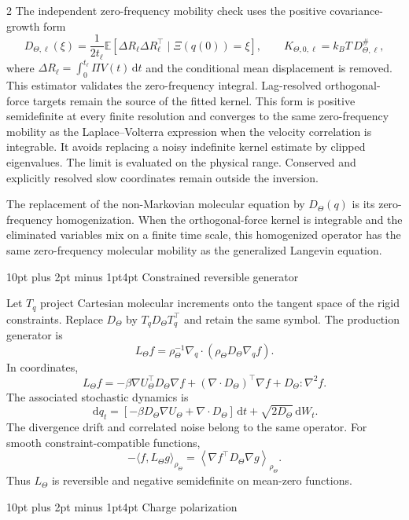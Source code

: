 \documentclass[10pt]{article}
\makeatletter
\renewcommand\section{\@startsection{section}{1}{0pt}%
  {10pt plus 2pt minus 1pt}{4pt}%
  {\large\sffamily\bfseries\color{lithioxfontgreen}}}
\newcommand{\dd}{\,\mathrm d}
\newcommand{\pinv}{^{\#}}
\makeatother
\begin{document}
\begin{multicols}{2}
The independent zero-frequency mobility check uses the positive covariance-growth
form
\[
\boxed{
D_{\Theta,\ell}(\xi)=\frac{1}{2t_\ell}
\mathbb E\!\left[
\Delta R_\ell\Delta R_\ell^\top\mid \Xi(q(0))=\xi
\right],\qquad
K_{\Theta,0,\ell}=k_BT\,D_{\Theta,\ell}\pinv,}
\]
where
\(
\Delta R_\ell=\int_0^{t_\ell}\Pi V(t)\dd t
\)
and the conditional mean displacement is removed. This estimator validates the
zero-frequency integral. Lag-resolved orthogonal-force targets remain the source of
the fitted kernel. This form is positive
semidefinite at every finite resolution and converges to the same zero-frequency
mobility as the Laplace--Volterra expression when the velocity correlation is
integrable.  It avoids replacing a noisy indefinite kernel estimate by clipped
eigenvalues.
The limit is evaluated on the physical range. Conserved and explicitly resolved slow
coordinates remain outside the inversion.

The replacement of the non-Markovian molecular equation by \(D_\Theta(q)\) is its
zero-frequency homogenization.  When the orthogonal-force kernel is integrable and
the eliminated variables mix on a finite time scale, this homogenized operator has
the same zero-frequency molecular mobility as the generalized Langevin equation.

\section{Constrained reversible generator}

Let \(T_q\) project Cartesian molecular increments onto the tangent space of the rigid
constraints. Replace \(D_\Theta\) by \(T_qD_\Theta T_q^\top\) and retain the same
symbol. The production generator is
\[
\boxed{
L_\Theta f=\rho_\Theta^{-1}\nabla_q\!\cdot
\left(\rho_\Theta D_\Theta\nabla_qf\right).}
\]
In coordinates,
\[
L_\Theta f=
-\beta\nabla U_\Theta^\top D_\Theta\nabla f
+(\nabla\!\cdot D_\Theta)^\top\nabla f
+D_\Theta:\nabla^2f.
\]
The associated stochastic dynamics is
\[
\dd q_t=
\left[-\beta D_\Theta\nabla U_\Theta
+\nabla\!\cdot D_\Theta\right]\dd t
+\sqrt{2D_\Theta}\dd W_t.
\]
The divergence drift and correlated noise belong to the same operator. For smooth
constraint-compatible functions,
\[
-\langle f,L_\Theta g\rangle_{\rho_\Theta}
=\left\langle\nabla f^\top D_\Theta\nabla g\right\rangle_{\rho_\Theta}.
\]
Thus \(L_\Theta\) is reversible and negative semidefinite on mean-zero functions.

\section{Charge polarization}


\end{multicols}
\end{document}
